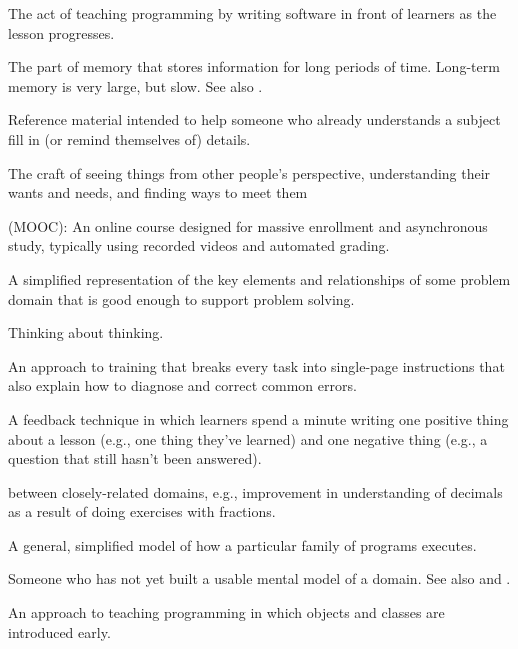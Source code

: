 \begin{description}
 The act of teaching programming by writing
software in front of learners as the lesson progresses.

 The part of memory that stores
information for long periods of time. Long-term memory is very large, but
slow. See also .

 Reference material intended to help someone who
already understands a subject fill in (or remind themselves of) details.

 The craft of seeing things from other people's
perspective, understanding their wants and needs, and finding ways to meet them

 (MOOC): An online course designed
for massive enrollment and asynchronous study, typically using recorded videos
and automated grading.

 A simplified representation of the key
elements and relationships of some problem domain that is good enough to support
problem solving.

 Thinking about thinking.

 An approach to training that breaks
every task into single-page instructions that also explain how to diagnose and
correct common errors.

 A feedback technique in which learners
spend a minute writing one positive thing about a lesson (e.g., one thing
they've learned) and one negative thing (e.g., a question that still hasn't been
answered).

 
between closely-related domains, e.g., improvement in understanding of decimals
as a result of doing exercises with fractions.

 A general, simplified model of how
a particular family of programs executes.

 Someone who has not yet built a usable mental model of
a domain. See also 
and .

 An approach to teaching programming in
which objects and classes are introduced early.


\end{description}
